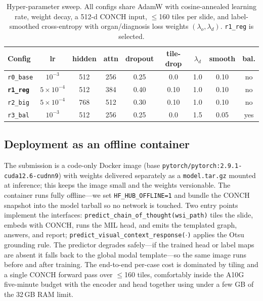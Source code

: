 \documentclass[11pt,a4paper]{article}
\newcommand{\code}[1]{\texttt{\small #1}}
\begin{document}
\begin{table}[h]
\centering
\caption{Hyper-parameter sweep. All configs share AdamW with cosine-annealed learning rate,
weight decay, a 512-d CONCH input, $\le$160 tiles per slide, and label-smoothed cross-entropy
with organ/diagnosis loss weights $(\lambda_o,\lambda_d)$. \code{r1\_reg} is selected.}
\label{tab:hparams}
\begin{tabular}{lcccccccc}
\toprule
Config & lr & hidden & attn & dropout & tile-drop & $\lambda_d$ & smooth & bal. \\
\midrule
\code{r0\_base} & $10^{-3}$ & 512 & 256 & 0.25 & 0.0 & 1.0 & 0.10 & no \\
\textbf{\code{r1\_reg}} & $5{\times}10^{-4}$ & 512 & 384 & 0.40 & 0.10 & 1.0 & 0.10 & no \\
\code{r2\_big} & $5{\times}10^{-4}$ & 768 & 512 & 0.30 & 0.10 & 1.0 & 0.10 & no \\
\code{r3\_bal} & $10^{-3}$ & 512 & 256 & 0.25 & 0.0 & 1.5 & 0.05 & yes \\
\bottomrule
\end{tabular}
\end{table}

\subsection{Deployment as an offline container}
\label{sec:deploy}
The submission is a code-only Docker image (base \code{pytorch/pytorch:2.9.1-cuda12.6-cudnn9})
with weights delivered separately as a \code{model.tar.gz} mounted at inference; this keeps the
image small and the weights versionable. The container runs fully offline---we set
\code{HF\_HUB\_OFFLINE=1} and bundle the CONCH snapshot into the model tarball so no network is
touched. Two entry points implement the interfaces: \code{predict\_chain\_of\_thought(wsi\_path)}
tiles the slide, embeds with CONCH, runs the MIL head, and emits the templated graph, answers,
and report; \code{predict\_visual\_context\_response($\cdot$)} applies the Otsu grounding rule.
The predictor degrades safely---if the trained head or label maps are absent it falls back to the
global modal template---so the same image runs before and after training. The end-to-end per-case
cost is dominated by tiling and a single CONCH forward pass over $\le$160 tiles, comfortably
inside the A10G five-minute budget with the encoder and head together using under a few GB of the
32\,GB RAM limit.

\end{document}
